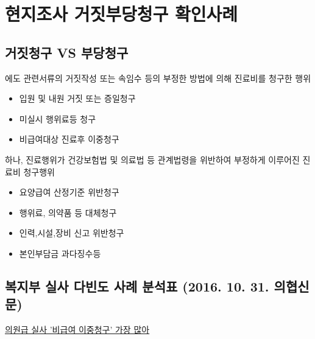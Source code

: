 \section{현지조사 거짓\cntrdot{}부당청구 확인사례}
\subsection{거짓청구 VS 부당청구}
\begin{description}\tightlist
\item[거짓청구] 에도 관련서류의 거짓작성 또는 속임수 등의 부정한 방법에 의해 진료비를 청구한 행위
	\begin{itemize}\tightlist
	\item 입원 및 내원 거짓 또는 증일청구
	\item 미실시 행위료등 청구
	\item 비급여대상 진료후 이중청구
	\end{itemize}
\item[부당청구] 하나, 진료행위가 건강보험법 및 의료법 등 관계법령을 위반하여 부정하게 이루어진 진료비 청구행위
	\begin{itemize}\tightlist
	\item 요양급여 산정기준 위반청구
	\item 행위료, 의약품 등 대체청구
	\item 인력,시설,장비 신고 위반청구
	\item 본인부담금 과다징수등
	\end{itemize}
\end{description}
\subsection{복지부 실사 다빈도 사례 분석표 (2016. 10. 31. 의협신문)} 
\href{http://www.doctorsnews.co.kr/news/articleView.html?idxno=113498}{의원급 실사 '비급여 이중청구' 가장 많아}
\par
\medskip

